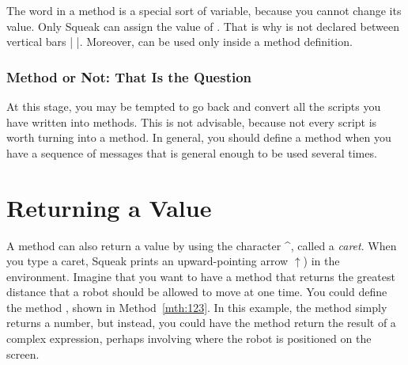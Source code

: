 \documentclass[a4paper,10pt,twoside]{book}
\begin{document}

The word  in a method is a special sort of variable, because you cannot change its 
value. Only Squeak can assign the value of . That is why  is not declared between 
vertical bars | |. Moreover,  can be used only inside a method definition. 


\subsubsection{Method or Not: That Is the Question} 

At this stage, you may be tempted to go back and convert all the scripts you have written into 
methods. This is not advisable, because not every script is worth turning into a method. In 
general, you should define a method when you have a sequence of messages that is general 
enough to be used several times.

\section{Returning a Value}

A method can also return a value by using the character \textasciicircum, called a \emph{caret}. When you type a 
caret, Squeak prints an upward-pointing arrow $\uparrow$) in the environment. Imagine that you 
want to have a method that returns the greatest distance that a robot should be allowed to 
move at one time. You could define the method , shown in Method~\ref{mth:123}. In this 
example, the method simply returns a number, but instead, you could have the method return 
the result of a complex expression, perhaps involving where the robot is positioned on the 
screen. 
\end{document}
